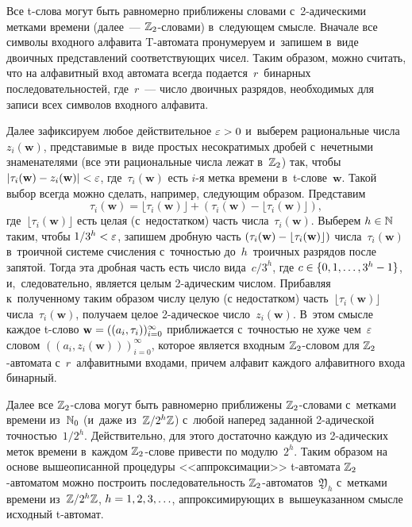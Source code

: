 \begin{multicols}{2}
Все t-слова
могут быть равномерно приближены словами с~2-ади\-че\-ски\-ми метками времени (далее~--- 
$\mathbb{Z}_2$-сло\-ва\-ми)
в~следующем смысле. Вначале все символы входного алфавита T-ав\-то\-ма\-та пронумеруем 
и~запишем в~виде двоичных представлений соответствующих чисел. Таким образом,
можно считать, что на алфавитный вход автомата всегда подается~$r$~бинарных 
последовательностей, где~$r$~--- число двоичных разрядов, необходимых для
записи всех символов входного алфавита.

Далее зафиксируем любое действительное $\varepsilon\hm>0$ и~выберем  рациональные 
числа~$z_i(\mathbf w)$, представимые в~виде простых несократимых
дробей с~нечетными знаменателями (все эти рациональные
числа лежат в~$\mathbb{Z}_2$) так, чтобы $|\tau_i(\mathbf w)\hm-z_i(\mathbf w)|
\hm<\varepsilon$, где~$\tau_i(\mathbf w)$
есть $i$-я метка времени в~t-сло\-ве~$\mathbf w$.  Такой выбор всегда можно
сделать, например, следующим образом.
Представим 
$$
\tau_i(\mathbf w)=\lfloor\tau_i(\mathbf w)\rfloor 
+ \left(\tau_i(\mathbf w)-\lfloor\tau_i(\mathbf w)\rfloor\right),
$$ 
где~$\lfloor\tau_i(\mathbf w)\rfloor$
есть целая (с~недостатком) часть чис\-ла~$\tau_i(\mathbf w)$. Выберем $h\hm\in\N$
таким, чтобы $1/3^{h}\hm<\varepsilon$, запишем дроб\-ную часть $(\tau_i(\mathbf w)
\hm-\lfloor\tau_i(\mathbf w)\rfloor)$ чис\-ла~$\tau_i(\mathbf w)$  в~троичной
сис\-те\-ме счис\-ле\-ния с~точ\-ностью до~$h$~троичных разрядов после запятой. Тогда
эта дроб\-ная часть есть чис\-ло вида~$c/3^h$, где $c\hm\in\{0,1,\ldots,3^h-1\}$,
и,~следовательно, является целым 2-ади\-че\-ским чис\-лом. Прибавляя к~полученному
таким образом
числу   целую (с недостатком) часть~$\lfloor\tau_i(\mathbf w)\rfloor$
числа~$\tau_i(\mathbf w)$, получаем
целое 2-ади\-че\-ское число~$z_i(\mathbf w)$. 
В~этом смысле каждое t-сло\-во $\mathbf w\hm= ((a_i,\tau_i))_{i=0}^\infty$ 
приближается с~точ\-ностью не хуже чем~$\varepsilon$ словом 
$((a_i,z_i(\mathbf w)))_{i=0}^\infty$,
которое является входным $\mathbb{Z}_2$-сло\-вом для $\mathbb{Z}_2$-ав\-то\-ма\-та с~$r$~алфавитными
входами, причем алфавит каждого алфавитного входа бинарный.

Далее все $\mathbb{Z}_2$-сло\-ва могут быть равномерно приближены $\mathbb{Z}_2$-сло\-ва\-ми с~метками
времени из~$\mathbb N_0$ (и~даже из~$\mathbb{Z}/2^h\mathbb{Z}$) с~любой наперед заданной 2-ади\-че\-ской 
точ\-ностью~$1/2^h$.
Действительно, для этого достаточно каждую из 2-ади\-че\-ских меток времени 
в~каждом $\mathbb{Z}_2$-сло\-ве привести по модулю~$2^h$.
 Таким\linebreak
  образом на основе вышеописанной процедуры <<аппроксимации>> 
 t-ав\-то\-ма\-та $\mathbb{Z}_2$-ав\-то\-ма\-том можно постро\-ить  последовательность 
 $\mathbb{Z}_2$-ав\-то\-ма\-тов~$\mathfrak Y_h$ с~метками
времени из~$\mathbb{Z}/2^h\mathbb{Z}$, $h\hm=1,2,3,\ldots$, аппроксимирующих в~вышеуказанном 
смысле исходный t-ав\-томат.


\end{multicols}
